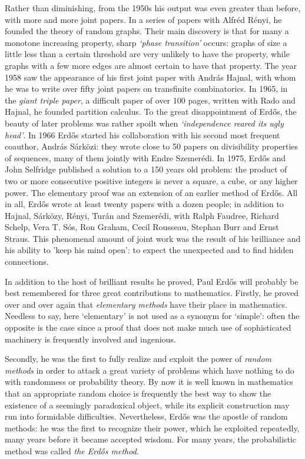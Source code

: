 Rather than diminishing, from the 1950s his output was even greater than 
before, with more and more joint papers. In a series of papers with 
Alfr\'ed R\'enyi, he founded the theory of random graphs. Their main discovery 
is that for many a monotone increasing property, sharp {\it `phase 
transition'} occurs: graphs of size a little less than a certain threshold
are very unlikely to have the property, while graphs with a few more edges
are almost certain to have that property. The year 1958 saw the appearance of 
his first joint paper with Andr\'as Hajnal, with whom he was to write over 
fifty joint papers on transfinite combinatorics. In 1965, in 
the {\it giant triple paper}, a difficult paper of over 100 pages, 
written with Rado and Hajnal, he founded partition calculus. To the
great disappointment of Erd\H{o}s, the beauty of later problems was rather
spoilt when {\it `independence reared its ugly head'}. In 1966 Erd\H{o}s 
started his collaboration with his second most frequent coauthor, Andr\'as
S\'ark\"ozi: they wrote close to 50 papers on divisibility properties
of sequences, many of them jointly with Endre Szemer\'edi. 
In 1975, Erd\H{o}s and John Selfridge published a solution to a 150 years
old problem: the product of two or more consecutive positive integers 
is never a square, a cube, or any higher power. The elementary proof was 
an extension of an earlier method of Erd\H{o}s.
All in all, 
Erd\H{o}s wrote at least twenty papers with a dozen people; in addition 
to Hajnal, S\'ark\"ozy, R\'enyi, Tur\'an and Szemer\'edi,
with Ralph Faudree, Richard Schelp, Vera T. S\'os,
Ron Graham, Cecil Rousseau, Stephan Burr and Ernst Straus.
This phenomenal amount of joint work was the result of his brilliance 
and his ability to 'keep his mind open': to expect the unexpected and
to find hidden connections.





In addition to the host of brilliant results he proved, Paul Erd\H{o}s will
probably be  best remembered for three great contributions to mathematics.
Firstly, he proved over and over again that {\it elementary methods} have 
their place in mathematics. Needless to say, here `elementary' is not 
used as a synonym for `simple': often the opposite is the case since a 
proof that does not make much use of sophisticated machinery is frequently 
involved and ingenious.


Secondly, he was the first
to fully realize and exploit the power of {\it random methods} in order to
attack a great variety of problems which have nothing to do with randomness or
probability theory.
By now it is well known in mathematics that an appropriate random choice is
frequently the best way to show the existence of a seemingly paradoxical 
object, while its explicit construction may run into formidable difficulties.
Nevertheless, Erd\H{o}s was the apostle of random methods: he was the 
first to recognize their power, which he exploited repeatedly, many years
before it became accepted wisdom. For many years, the probabilistic
method was called {\it the Erd\H{o}s method}.


